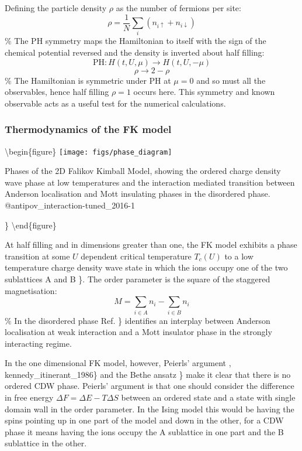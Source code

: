 Defining the particle density \(\rho\) as the number of fermions per site: \[
    \rho = \frac{1}{N} \sum_i \left( n_{i \uparrow} + n_{i \downarrow} \right)
\] \% The PH symmetry maps the Hamiltonian to itself with the sign of the chemical potential reversed and the density is inverted about half filling: \[ \text{PH} : H(t, U, \mu) \rightarrow H(t, U, -\mu) \] \[ \rho \rightarrow 2 - \rho \] \% The Hamiltonian is symmetric under PH at \(\mu = 0\) and so must all the observables, hence half filling \(\rho = 1\) occurs here. This symmetry and known observable acts as a useful test for the numerical calculations.

\hypertarget{thermodynamics-of-the-fk-model}{%
\subsubsection{Thermodynamics of the FK model}\label{thermodynamics-of-the-fk-model}}

\textbackslash begin\{figure\} \centering \texttt{[image: figs/phase\_diagram]}

\caption{Phases of the 2D Falikov Kimball Model, showing the ordered charge density wave phase at low temperatures and the interaction mediated transition between Anderson localisation and Mott insulating phases in the disordered phase. @antipov_interaction-tuned_2016-1}

\} \label{fig:FK_phase_diagram} \textbackslash end\{figure\}

At half filling and in dimensions greater than one, the FK model exhibits a phase transition at some \(U\) dependent critical temperature \(T_c(U)\) to a low temperature charge density wave state in which the ions occupy one of the two sublattices A and B \textcite{maska_thermodynamics_2006-1}\}. The order parameter is the square of the staggered magnetisation: \[
M = \sum_{i \in A} n_i - \sum_{i \in B} n_i
\] \% In the disordered phase Ref. \textcite{antipov_interaction-tuned_2016-1}\} identifies an interplay between Anderson localisation at weak interaction and a Mott insulator phase in the strongly interacting regime.

In the one dimensional FK model, however, Peierls' argument \textcite{peierls_isings_1936}, kennedy\_itinerant\_1986\} and the Bethe ansatz \textcite{lieb_absence_1968}\} make it clear that there is no ordered CDW phase. Peierls' argument is that one should consider the difference in free energy \(\Delta F = \Delta E - T\Delta S\) between an ordered state and a state with single domain wall in the order parameter. In the Ising model this would be having the spins pointing up in one part of the model and down in the other, for a CDW phase it means having the ions occupy the A sublattice in one part and the B sublattice in the other.

